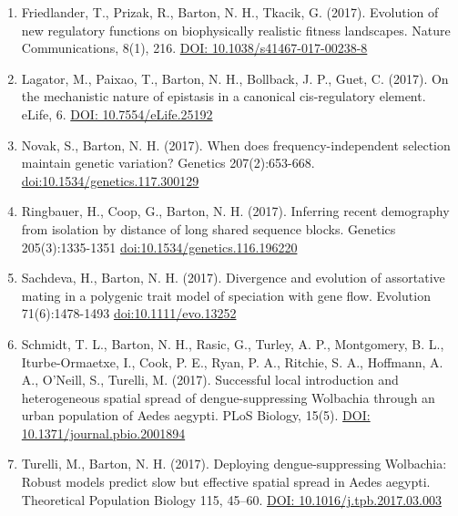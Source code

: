 \documentclass[10pt]{article}
\begin{document}
\begin{cv}
\begin{enumerate}
\item Friedlander, T., Prizak, R., Barton, N. H., Tkacik, G. (2017). Evolution of new regulatory functions on biophysically realistic fitness landscapes. Nature Communications, 8(1), 216.
\href{https://research-explorer.app.ist.ac.at/record/955}{DOI: 10.1038/s41467-017-00238-8}
\item Lagator, M., Paixao, T., Barton, N. H., Bollback, J. P., Guet, C. (2017). On the mechanistic nature of epistasis in a canonical cis-regulatory element. eLife, 6. 
\href{https://research-explorer.app.ist.ac.at/record/954}{DOI: 10.7554/eLife.25192}
\item Novak, S., Barton, N. H. (2017). When does frequency-independent selection maintain genetic variation? Genetics 207(2):653-668.
\href{http://dx.doi.org/10.1534/genetics.117.300129}{doi:10.1534/genetics.117.300129}
\item Ringbauer, H., Coop, G., Barton, N. H. (2017). Inferring recent demography from isolation by distance of long shared sequence blocks. Genetics 205(3):1335-1351 
\href{http://dx.doi.org/10.1534/genetics.116.196220}{doi:10.1534/genetics.116.196220}
\item Sachdeva, H., Barton, N. H. (2017). Divergence and evolution of assortative mating in a polygenic trait model of speciation with gene flow. Evolution 71(6):1478-1493 
\href{http://dx.doi.org/10.1111/evo.13252}{doi:10.1111/evo.13252}
\item Schmidt, T. L., Barton, N. H., Rasic, G., Turley, A. P., Montgomery, B. L., Iturbe-Ormaetxe, I., Cook, P. E., Ryan, P. A., Ritchie, S. A., Hoffmann, A. A., O’Neill, S., Turelli, M. (2017). Successful local introduction and heterogeneous spatial spread of dengue-suppressing Wolbachia through an urban population of Aedes aegypti. PLoS Biology, 15(5).
\href{https://research-explorer.app.ist.ac.at/record/951}{DOI: 10.1371/journal.pbio.2001894}
\item Turelli, M., Barton, N. H. (2017). Deploying dengue-suppressing Wolbachia: Robust models predict slow but effective spatial spread in Aedes aegypti. Theoretical Population Biology 115, 45–60.
\href{https://research-explorer.app.ist.ac.at/record/952}{DOI: 10.1016/j.tpb.2017.03.003}



\end{enumerate}
\end{cv}
\end{document}
